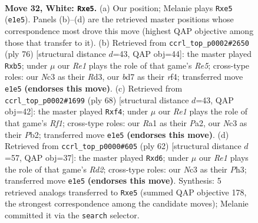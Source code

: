 \documentclass[11pt]{article}
\begin{document}
\clearpage

\begin{figure}[p]\centering
\begin{subfigure}{0.46\textwidth}\centering
\resizebox{\linewidth}{!}{%
\newchessgame
\chessboard[
  setfen={8/3bk2r/1p2p3/p3n3/P5r1/1PN3P1/5K2/R3R3 w - - 0 32},
  showmover=false,
  pgfstyle=straightmove, color=movearrow, markmove={e1-e5}
]}
\caption{}
\end{subfigure}\hfill
\begin{subfigure}{0.46\textwidth}\centering
\resizebox{\linewidth}{!}{%
\newchessgame
\chessboard[
  setfen={2r5/3N2pk/7p/1p2R2P/1P3rb1/P2R4/1KP5/8 w - - 9 39},
  showmover=false,
  pgfstyle=straightmove, color=movearrow, markmove={e5-b5}
]}
\caption{}
\end{subfigure}
\\[4pt]
\begin{subfigure}{0.46\textwidth}\centering
\resizebox{\linewidth}{!}{%
\newchessgame
\chessboard[
  setfen={r7/6pk/2N2b1p/3r1p1P/3P1n2/1R6/PP6/1K3R2 w - - 0 35},
  showmover=false,
  pgfstyle=straightmove, color=movearrow, markmove={f1-f4}
]}
\caption{}
\end{subfigure}\hfill
\begin{subfigure}{0.46\textwidth}\centering
\resizebox{\linewidth}{!}{%
\newchessgame
\chessboard[
  setfen={5rk1/5p2/3n2p1/4p3/4P3/1r3P1P/1P1R1K1P/3R4 w - - 0 32},
  showmover=false,
  pgfstyle=straightmove, color=movearrow, markmove={d2-d6}
]}
\caption{}
\end{subfigure}
\caption{\textbf{Move 32, White: \texttt{Rxe5}.} (a) Our position; Melanie plays \texttt{Rxe5} (\texttt{e1e5}). Panels (b)--(d) are the retrieved master positions whose correspondence most drove this move (highest QAP objective among those that transfer to it). (b) Retrieved from \texttt{ccrl\_top\_p0002\#2650} (ply 76) [structural distance $d$=43, QAP obj=44]: the master played \texttt{Rxb5}; under $\mu$ our \emph{Re1} plays the role of that game's \emph{Re5}; cross-type roles: our \emph{N}c3 as their \emph{R}d3, our \emph{b}d7 as their \emph{r}f4; transferred move \texttt{e1e5} \textbf{(endorses this move)}. (c) Retrieved from \texttt{ccrl\_top\_p0002\#1699} (ply 68) [structural distance $d$=43, QAP obj=42]: the master played \texttt{Rxf4}; under $\mu$ our \emph{Re1} plays the role of that game's \emph{Rf1}; cross-type roles: our \emph{R}a1 as their \emph{P}a2, our \emph{N}c3 as their \emph{P}b2; transferred move \texttt{e1e5} \textbf{(endorses this move)}. (d) Retrieved from \texttt{ccrl\_top\_p0000\#605} (ply 62) [structural distance $d$=57, QAP obj=37]: the master played \texttt{Rxd6}; under $\mu$ our \emph{Re1} plays the role of that game's \emph{Rd2}; cross-type roles: our \emph{N}c3 as their \emph{P}h3; transferred move \texttt{e1e5} \textbf{(endorses this move)}. Synthesis: 5 retrieved analogs transferred to \texttt{Rxe5} (summed QAP objective 178, the strongest correspondence among the candidate moves); Melanie committed it via the \texttt{search} selector.}
\label{fig:thought-m62}
\end{figure}
\end{document}
